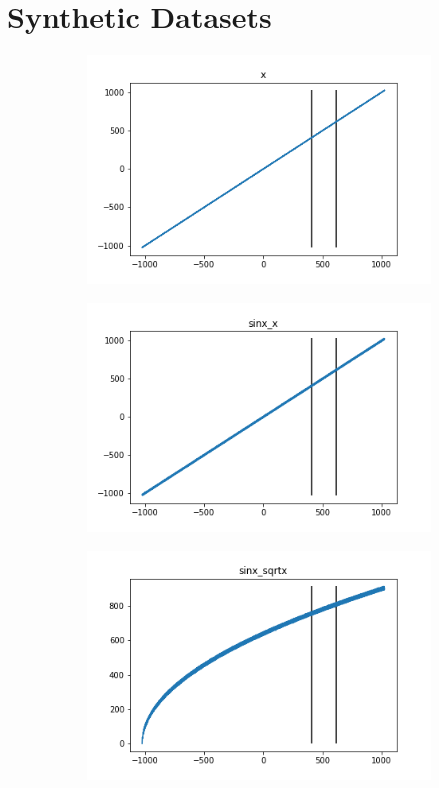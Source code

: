 \appendix
\section{Synthetic Datasets}\label{app:data}
\begin{figure}[ht]
    \centering
    \begin{subfigure}{0.45\textwidth}
        \includegraphics[width=\textwidth]{img/data_x.png}
    \end{subfigure}
    \begin{subfigure}{0.45\textwidth}
        \includegraphics[width=\textwidth]{img/data_sinx_x.png}
    \end{subfigure}
    \begin{subfigure}{0.45\textwidth}
        \includegraphics[width=\textwidth]{img/data_sinx_sqrtx.png}

\end{subfigure}
\end{figure}

